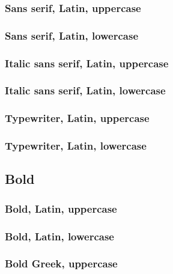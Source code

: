 \documentclass[a4paper,final]{article}
\begin{document}
\subsubsection{Sans serif, Latin, uppercase}

\subsubsection{Sans serif, Latin, lowercase}

\subsubsection{Italic sans serif, Latin, uppercase}

\subsubsection{Italic sans serif, Latin, lowercase}

\subsubsection{Typewriter, Latin, uppercase}

\subsubsection{Typewriter, Latin, lowercase}

\subsection{Bold}

\subsubsection{Bold, Latin, uppercase}

\subsubsection{Bold, Latin, lowercase}

\subsubsection{Bold Greek, uppercase}
\end{document}
